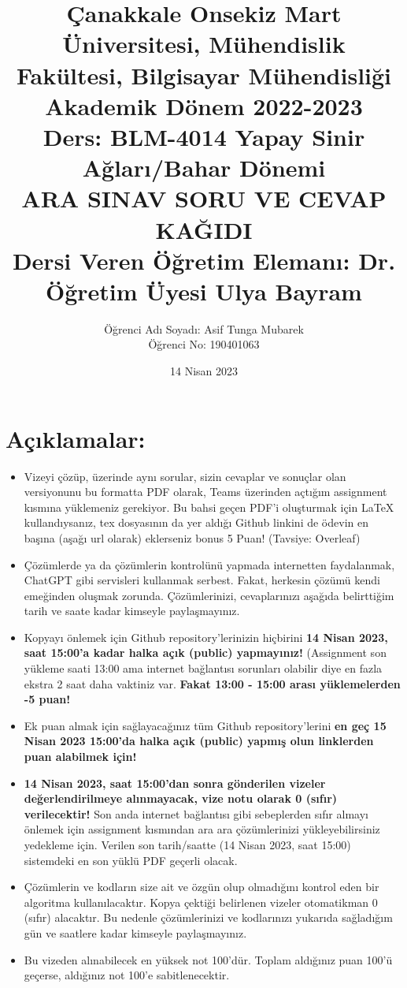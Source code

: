 \documentclass[11pt]{article}
\title{Çanakkale Onsekiz Mart Üniversitesi, Mühendislik Fakültesi, Bilgisayar Mühendisliği Akademik Dönem 2022-2023\\
Ders: BLM-4014 Yapay Sinir Ağları/Bahar Dönemi\\ 
ARA SINAV SORU VE CEVAP KAĞIDI\\
Dersi Veren Öğretim Elemanı: Dr. Öğretim Üyesi Ulya Bayram}
\author{%
\begin{minipage}{\textwidth}
\raggedright
Öğrenci Adı Soyadı: Asif Tunga Mubarek\\ %
Öğrenci No: 190401063
\end{minipage}%
}
\date{14 Nisan 2023}
\begin{document}
\maketitle

\vspace{-.5in}
\section*{Açıklamalar:}
\begin{itemize}
    \item Vizeyi çözüp, üzerinde aynı sorular, sizin cevaplar ve sonuçlar olan versiyonunu bu formatta PDF olarak, Teams üzerinden açtığım assignment kısmına yüklemeniz gerekiyor. Bu bahsi geçen PDF'i oluşturmak için LaTeX kullandıysanız, tex dosyasının da yer aldığı Github linkini de ödevin en başına (aşağı url olarak) eklerseniz bonus 5 Puan! (Tavsiye: Overleaf)
    \item Çözümlerde ya da çözümlerin kontrolünü yapmada internetten faydalanmak, ChatGPT gibi servisleri kullanmak serbest. Fakat, herkesin çözümü kendi emeğinden oluşmak zorunda. Çözümlerinizi, cevaplarınızı aşağıda belirttiğim tarih ve saate kadar kimseyle paylaşmayınız. 
    \item Kopyayı önlemek için Github repository'lerinizin hiçbirini \textbf{14 Nisan 2023, saat 15:00'a kadar halka açık (public) yapmayınız!} (Assignment son yükleme saati 13:00 ama internet bağlantısı sorunları olabilir diye en fazla ekstra 2 saat daha vaktiniz var. \textbf{Fakat 13:00 - 15:00 arası yüklemelerden -5 puan!}
    \item Ek puan almak için sağlayacağınız tüm Github repository'lerini \textbf{en geç 15 Nisan 2023 15:00'da halka açık (public) yapmış olun linklerden puan alabilmek için!}
    \item \textbf{14 Nisan 2023, saat 15:00'dan sonra gönderilen vizeler değerlendirilmeye alınmayacak, vize notu olarak 0 (sıfır) verilecektir!} Son anda internet bağlantısı gibi sebeplerden sıfır almayı önlemek için assignment kısmından ara ara çözümlerinizi yükleyebilirsiniz yedekleme için. Verilen son tarih/saatte (14 Nisan 2023, saat 15:00) sistemdeki en son yüklü PDF geçerli olacak.
    \item Çözümlerin ve kodların size ait ve özgün olup olmadığını kontrol eden bir algoritma kullanılacaktır. Kopya çektiği belirlenen vizeler otomatikman 0 (sıfır) alacaktır. Bu nedenle çözümlerinizi ve kodlarınızı yukarıda sağladığım gün ve saatlere kadar kimseyle paylaşmayınız.
    \item Bu vizeden alınabilecek en yüksek not 100'dür. Toplam aldığınız puan 100'ü geçerse, aldığınız not 100'e sabitlenecektir.  

\end{itemize}
\end{document}
